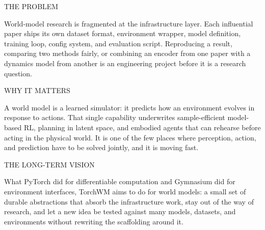 \documentclass[10pt,a4paper]{article}
\newcommand{\kicker}[1]{{\footnotesize\displayfont\color{accent}\MakeUppercase{#1}}}
\begin{document}
\begin{minipage}[t]{0.315\textwidth}
  \kicker{The problem}\par\vspace{1.5mm}
  {\footnotesize
  World-model research is fragmented at the infrastructure layer. Each influential paper ships its
  own dataset format, environment wrapper, model definition, training loop, config system, and
  evaluation script. Reproducing a result, comparing two methods fairly, or combining an encoder
  from one paper with a dynamics model from another is an engineering project before it is a
  research question.}
\end{minipage}\hfill
\begin{minipage}[t]{0.315\textwidth}
  \kicker{Why it matters}\par\vspace{1.5mm}
  {\footnotesize
  A world model is a learned simulator: it predicts how an environment evolves in response to
  actions. That single capability underwrites sample-efficient model-based RL, planning in latent
  space, and embodied agents that can rehearse before acting in the physical world. It is one of
  the few places where perception, action, and prediction have to be solved jointly, and it is
  moving fast.}
\end{minipage}\hfill
\begin{minipage}[t]{0.315\textwidth}
  \kicker{The long-term vision}\par\vspace{1.5mm}
  {\footnotesize
  What PyTorch did for differentiable computation and Gymnasium did for environment interfaces,
  TorchWM aims to do for world models: a small set of durable abstractions that absorb the
  infrastructure work, stay out of the way of research, and let a new idea be tested against many
  models, datasets, and environments without rewriting the scaffolding around it.}
\end{minipage}

\vspace{5mm}
\end{document}
